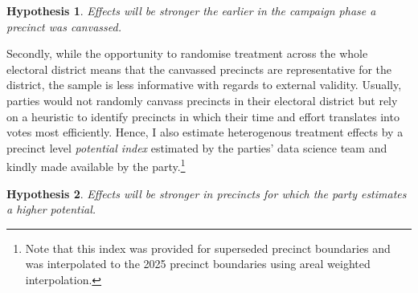 \documentclass[11pt,a4paper]{scrartcl}
\newtheorem{hyp}{Hypothesis}
\begin{document}
\begin{hyp}\label{h:timinga}
	Effects will be stronger the earlier in the campaign phase a precinct was canvassed.
\end{hyp}

Secondly, while the opportunity to randomise treatment across the whole electoral district means that the canvassed precincts are representative for the district, the sample is less informative with regards to external validity. Usually, parties would not randomly canvass precincts in their electoral district but rely on a heuristic to identify precincts in which their time and effort translates into votes most efficiently. Hence, I also estimate heterogenous treatment effects by a precinct level \emph{potential index} estimated by the parties' data science team and kindly made available by the party.\footnote{Note that this index was provided for superseded precinct boundaries and was interpolated to the 2025 precinct boundaries using areal weighted interpolation.}

\begin{hyp}\label{h:potential}
	Effects will be stronger in precincts for which the party estimates a higher potential.
\end{hyp}
\end{document}
